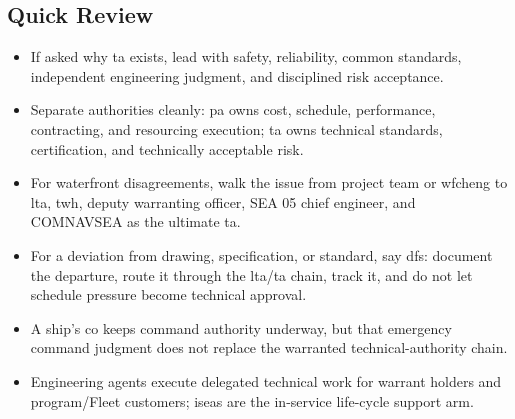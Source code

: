 \documentclass[../main.tex]{subfiles}
\begin{document}
\subsection{Quick Review}
\begin{itemize}
  \item If asked why \ac{ta} exists, lead with safety, reliability, common standards, independent engineering judgment, and disciplined risk acceptance.
  \item Separate authorities cleanly: \ac{pa} owns cost, schedule, performance, contracting, and resourcing execution; \ac{ta} owns technical standards, certification, and technically acceptable risk.
  \item For waterfront disagreements, walk the issue from project team or \ac{wfcheng} to \ac{lta}, \ac{twh}, deputy warranting officer, SEA 05 chief engineer, and COMNAVSEA as the ultimate \ac{ta}.
  \item For a deviation from drawing, specification, or standard, say \ac{dfs}: document the departure, route it through the \ac{lta}/\ac{ta} chain, track it, and do not let schedule pressure become technical approval.
  \item A ship's \ac{co} keeps command authority underway, but that emergency command judgment does not replace the warranted technical-authority chain.
  \item Engineering agents execute delegated technical work for warrant holders and program/Fleet customers; \acp{isea} are the in-service life-cycle support arm.
\end{itemize}

\end{document}
